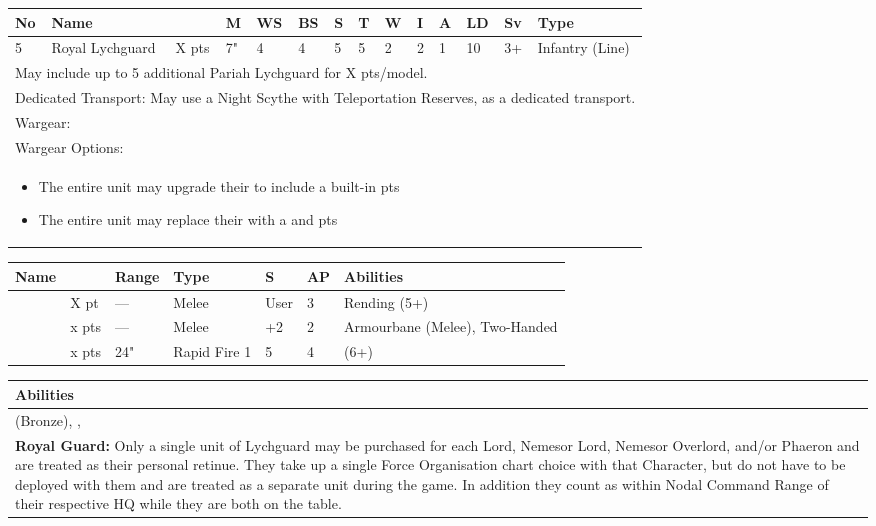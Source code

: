 \newpage
{}

\noindent
\begin{tabular}{||m{10pt} m{95pt} m{30pt} m{11pt} m{11pt} m{11pt} m{11pt} m{11pt} m{11pt} m{11pt} m{11pt} m{11pt} m{11pt} m{125pt}||}
	\hline
	No & Name & & M & WS & BS & S & T & W & I & A & LD & Sv & Type \\
	\hline
	5 & Royal Lychguard & X pts & 7" & 4 & 4 & 5 & 5 & 2 & 2 & 1 & 10 & 3+ & Infantry (Line)\\
	\hline
	\hline
	\multicolumn{14}{||Z{532 pt}||}{May include up to 5 additional Pariah Lychguard for X pts/model.}\\	
	\multicolumn{14}{||Z{532 pt}||}{Dedicated Transport: May use a Night Scythe with Teleportation Reserves, as a dedicated transport.}\\	
	\hline
	\hline
	\multicolumn{14}{||Z{532 pt}||}{Wargear: \quickref{Warscythe}}\\
	\multicolumn{14}{||Z{532 pt}||}{Wargear Options:} \\
	\multicolumn{14}{||Z{532 pt}||}{\begin{itemize}
			\item The entire unit may upgrade their \quickref{Warscythe} to include a built-in \quickref{Gauss Blaster} \hrulefill 5 pts
			\item The entire unit may replace their \quickref{Warscythe} with a \quickref{Hyperphase Sword} and \quickref{Dispersion Shield} \hrulefill 10 pts
	\end{itemize}} \\
	\hline
\end{tabular}

\noindent
\begin{tabular}{||m{110pt} m{30pt} m{31pt} m{55pt} m{12pt} m{12pt} m{210pt}||}
	\hline
	Name & & Range & Type & S & AP & Abilities \\
	\hline
	\quickref{Hyperphase Sword} & X pt & — & Melee & User & 3 & Rending (5+) \\
	\quickref{Warscythe} & x pts& — & Melee & +2 & 2 & Armourbane (Melee), Two-Handed \\
	\quickref{Gauss Blaster} & x pts& 24" & Rapid Fire 1 & 5 & 4 & \quickref{Gauss} (6+) \\
	\hline
\end{tabular}

\noindent
\begin{tabular}{||m{532pt}||}
	\hline
	Abilities \\
	\hline
	\quickref{Awakening Protocols} (Bronze), \quickref{Living Metal}, \quickref{Reanimation Protocols} \\
	\textbf{Royal Guard:} Only a single unit of Lychguard may be purchased for each Lord, Nemesor Lord, Nemesor Overlord, and/or Phaeron and are treated as their personal retinue. They take up a single Force Organisation chart choice with that Character, but do not have to be deployed with them and are treated as a separate unit during the game. In addition they count as within Nodal Command Range of their respective HQ while they are both on the table. \\
	\hline
\end{tabular}




